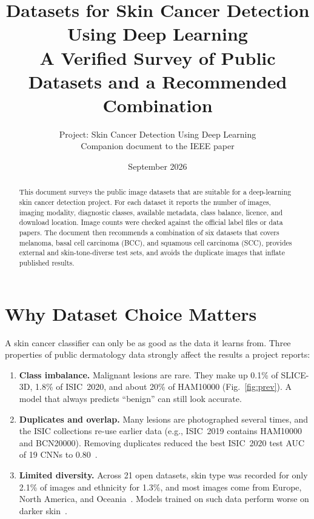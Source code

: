 \documentclass[10pt,a4paper]{article}
\title{\color{hcBlue}\bfseries Datasets for Skin Cancer Detection Using Deep Learning\\[4pt]
\large A Verified Survey of Public Datasets and a Recommended Combination}
\author{Project: Skin Cancer Detection Using Deep Learning\\
\small Companion document to the IEEE paper}
\date{September 2026}
\begin{document}
\maketitle
\thispagestyle{empty}

\begin{abstract}
\noindent This document surveys the public image datasets that are
suitable for a deep-learning skin cancer detection project. For each
dataset it reports the number of images, imaging modality, diagnostic
classes, available metadata, class balance, licence, and download
location. Image counts were checked against the official label files
or data papers. The document then recommends a combination of six
datasets that covers melanoma, basal cell carcinoma (BCC), and
squamous cell carcinoma (SCC), provides external and skin-tone-diverse
test sets, and avoids the duplicate images that inflate published
results.
\end{abstract}

\tableofcontents
\newpage

\section{Why Dataset Choice Matters}
A skin cancer classifier can only be as good as the data it learns
from. Three properties of public dermatology data strongly affect the
results a project reports:
\begin{enumerate}
  \item \textbf{Class imbalance.} Malignant lesions are rare. They
        make up 0.1\% of SLICE-3D, 1.8\% of ISIC~2020, and about 20\%
        of HAM10000 (Fig.~\ref{fig:prev}). A model that always predicts
        ``benign'' can still look accurate.
  \item \textbf{Duplicates and overlap.} Many lesions are photographed
        several times, and the ISIC collections re-use earlier data
        (e.g., ISIC~2019 contains HAM10000 and BCN20000). Removing
        duplicates reduced the best ISIC~2020 test AUC of 19 CNNs to
        0.80~\cite{cassidy2022isic}.
  \item \textbf{Limited diversity.} Across 21 open datasets, skin type
        was recorded for only 2.1\% of images and ethnicity for 1.3\%,
        and most images come from Europe, North America, and
        Oceania~\cite{wen2022}. Models trained on such data perform
        worse on darker skin~\cite{daneshjou2022ddi}.
\end{enumerate}
\end{document}
